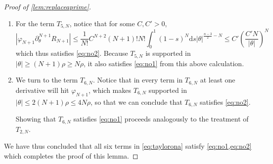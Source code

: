 \documentclass[
	fontsize=11pt, 
	twoside=false, 
	abstract=true, 
	a4paper,
]{scrartcl}
\newcommand{\dd}{\mathrm{d}}
\newcommand{\abs}[1]{\left\lvert#1\right\rvert}
\newcommand{\del}{\partial}
\newcommand{\td}[1]{\tilde{#1}}
\begin{document}
\begin{proof}[Proof of \cref{lem:replaceaprime}]
\begin{enumerate}[leftmargin=*]
		\[
			\abs{R_{N+1}} \leq \frac{1}{N!} C^{N+1} (N+1)! \int_0^1 (1-s)^N\dd s \abs{\theta}^{\frac{n-3}{2}} \leq C^{N+1} \abs{\theta}^{\frac{n-3}{2}}\,,
		\]
		and since $R_{N+1}$ is supported in $\abs{\theta}>\rho$, we see that $T_{4,N}$ satisfies \cref{eq:no1} too.
		\item For the term $T_{5,N}$, notice that for some $C,C'>0$,
		\[
			\abs{\varphi_{N+1} \del^{N+1}_\theta R_{N+1}} \leq \frac{1}{N!}C^{N+2} (N+1)! N! \int_0^1 (1-s)^N\dd s \abs{\theta}^{\frac{n-3}{2}-N} \leq C'\left(\frac{C'N}{\abs{\theta}}\right)^N
		\]
		which thus satisfies \cref{eq:no2}. Because $T_{5,N}$ is supported in $\abs{\theta} \geq (N+1)\rho \geq N\rho$, it also satisfies \cref{eq:no1} from this above calculation. 
		\item We turn to the term $T_{6,N}$. Notice that in every term in $T_{6,N}$ at least one derivative will hit $\varphi_{N+1}$, which makes $T_{6,N}$ supported in $\abs{\theta} \leq 2(N+1)\rho \leq 4N\rho$, so that we can conclude that $T_{6,N}$ satisfies \cref{eq:no2}. 

		Showing that $T_{6,N}$ satisfies \cref{eq:no1} proceeds analogously to the treatment of $T_{2,N}$.

		\end{enumerate}
		We have thus concluded that all six terms in \cref{eq:taylorona} satisfy \cref{eq:no1,eq:no2} which completes the proof of this lemma. 
\end{proof}
\end{document}

